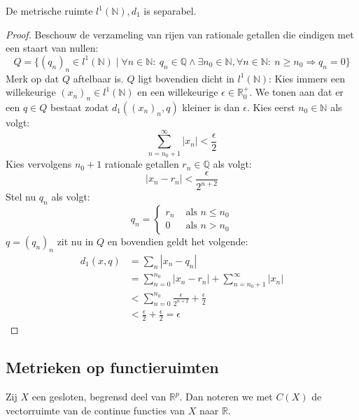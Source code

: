 \documentclass[main.tex]{subfiles}
\begin{document}
\begin{vb}
  De metrische ruimte $l^{1}(\mathbb{N}),d_{1}$ is separabel.
  
  \begin{proof}
    Beschouw de verzameling van rijen van rationale getallen die eindigen met een staart van nullen:
    \[ Q = \{ (q_{n})_{n} \in l^{1}(\mathbb{N}) \mid \forall n\in \mathbb{N}:\ q_{n}\in \mathbb{Q} \wedge \exists n_{0}\in \mathbb{N}, \forall n\in \mathbb{N}:\ n \ge n_{0} \Rightarrow q_{n} = 0 \} \]
    Merk op dat $Q$ aftelbaar is.
    $Q$ ligt bovendien dicht in $l^{1}(\mathbb{N})$:
    Kies immers een willekeurige $(x_{n})_{n}\in l^{1}(\mathbb{N})$ en een willekeurige $\epsilon \in \mathbb{R}_{0}^{+}$.
    We tonen aan dat er een $q\in Q$ bestaat zodat $d_{1}((x_{n})_{n},q)$ kleiner is dan $\epsilon$.
    Kies eerst $n_{0}\in \mathbb{N}$ als volgt:
    \[ \sum_{n=n_{0}+1}^{\infty}|x_{n}| < \frac{\epsilon}{2} \]
    Kies vervolgens $n_{0}+1$ rationale getallen $r_{n}\in \mathbb{Q}$ als volgt:
    \[ |x_{n}-r_{n}| < \frac{\epsilon}{2^{n+2}} \]
    Stel nu $q_{n}$ als volgt:
    \[
    q_{n} =
    \begin{cases}
      r_{n} &\text{ als } n \le n_{0}\\
      0 &\text{ als } n > n_{0}
    \end{cases}
    \]
    $q=(q_{n})_{n}$ zit nu in $Q$ en bovendien geldt het volgende:
    \begin{align*}
      d_{1}(x,q)
      &= \sum_{n}|x_{n}-q_{n}|\\
      &= \sum_{n=0}^{n_{0}}|x_{n}-r_{n}| + \sum_{n=n_{0}+1}^{\infty}|x_{n}|\\
      &< \sum_{n=0}^{n_{0}}\frac{\epsilon}{2^{n+2}} + \frac{\epsilon}{2}\\
      &< \frac{\epsilon}{2} + \frac{\epsilon}{2} = \epsilon
    \end{align*}
  \end{proof}
\end{vb}



\subsection{Metrieken op functieruimten}
\label{sec:metr-op-funct}

\begin{de}
  Zij $X$ een gesloten, begrensd deel van $\mathbb{R}^{p}$. Dan noteren we met $C(X)$ de vectorruimte van de continue functies van $X$ naar $\mathbb{R}$.
\end{de}
\end{document}

